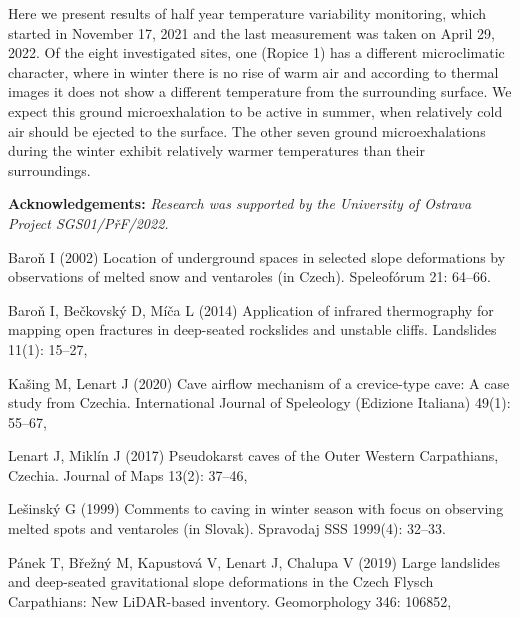 {Here we present results of half year temperature variability monitoring, which started in November 17, 2021 and the last measurement was taken on April 29, 2022. Of the eight investigated sites, one (Ropice 1) has a different microclimatic character, where in winter there is no rise of warm air and according to thermal images it does not show a different temperature from the surrounding surface. We expect this ground microexhalation to be active in summer, when relatively cold air should be ejected to the surface. The other seven ground microexhalations during the winter exhibit relatively warmer temperatures than their surroundings.

\vspace{0.5em}
\noindent
\textbf{Acknowledgements:}
\textit{Research was supported by the University of Ostrava Project SGS01/PřF/2022.}	
}
{Baroň I (2002) Location of underground spaces in selected slope deformations by observations of melted snow and ventaroles (in Czech). Speleofórum 21: 64–66.

Baroň I, Bečkovský D, Míča L (2014) Application of infrared thermography for mapping open fractures in deep-seated rockslides and unstable cliffs. Landslides 11(1): 15–27,\\ 

Kašing M, Lenart J (2020) Cave airflow mechanism of a crevice-type cave: A case study from Czechia. International Journal of Speleology (Edizione Italiana) 49(1): 55–67, 

Lenart J, Miklín J (2017) Pseudokarst caves of the Outer Western Carpathians, Czechia. Journal of Maps 13(2): 37–46, 

Lešinský G (1999) Comments to caving in winter season with focus on observing melted spots and ventaroles (in Slovak). Spravodaj SSS 1999(4): 32–33.

Pánek T, Břežný M, Kapustová V, Lenart J, Chalupa V (2019) Large landslides and deep-seated gravitational slope deformations in the Czech Flysch Carpathians: New LiDAR-based inventory. Geomorphology 346: 106852, 
}


